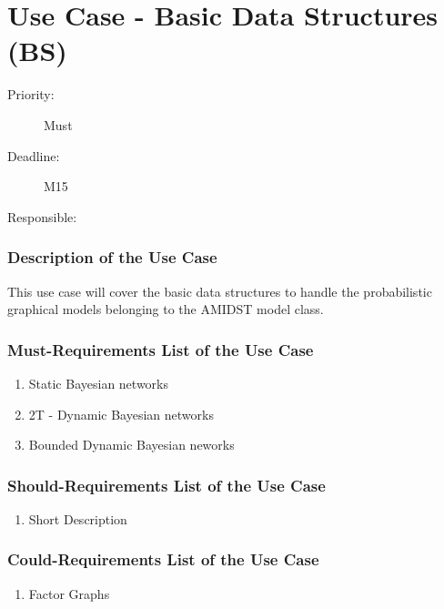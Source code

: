 \newpage
\section{Use Case - Basic Data Structures (BS)}
\label{UseCase:BS}

\begin{description}
\item[Priority:] Must
\item[Deadline:] M15
\item[Responsible:] 
\end{description}

\subsubsection*{Description of the Use Case}

This use case will cover the basic data structures to handle the probabilistic graphical models belonging to the AMIDST model class.

\subsubsection*{Must-Requirements List of the Use Case}

\begin{enumerate}
\item Static Bayesian networks
\item 2T - Dynamic Bayesian networks
\item Bounded Dynamic Bayesian neworks
\end{enumerate}

\subsubsection*{Should-Requirements List of the Use Case}

\begin{enumerate}
\item Short Description
\end{enumerate}

\subsubsection*{Could-Requirements List of the Use Case}

\begin{enumerate}
\item Factor Graphs
\end{enumerate}



